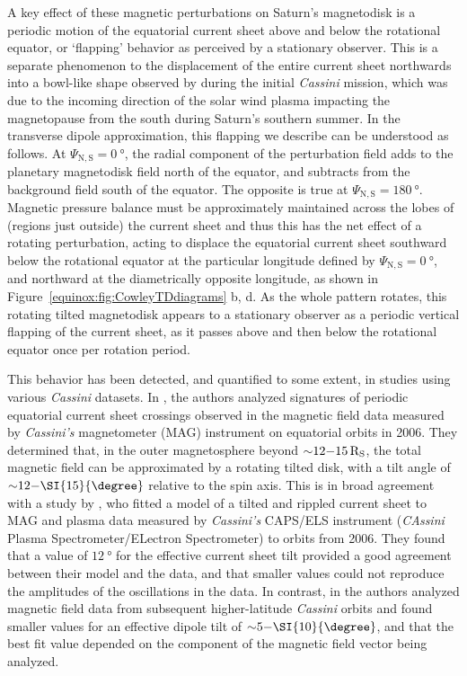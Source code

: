 A key effect of these magnetic perturbations on Saturn's magnetodisk is a periodic motion of the equatorial current sheet above and below the rotational equator, or `flapping' behavior as perceived by a stationary observer. This is a separate phenomenon to the displacement of the entire current sheet northwards into a bowl-like shape observed by \citet{arridge2008warp} during the initial \textit{Cassini} mission, which was due to the incoming direction of the solar wind plasma impacting the magnetopause from the south during Saturn's southern summer. In the transverse dipole approximation, this flapping we describe can be understood as follows. At $\Psi_\mathrm{N,S} = \SI{0}{\degree}$, the radial component of the perturbation field adds to the planetary magnetodisk field north of the equator, and subtracts from the background field south of the equator. The opposite is true at $\Psi_\mathrm{N,S} = \SI{180}{\degree}$. Magnetic pressure balance must be approximately maintained across the lobes of (regions just outside) the current sheet and thus this has the net effect of a rotating perturbation, acting to displace the equatorial current sheet southward below the rotational equator at the particular longitude defined by $\Psi_\mathrm{N,S} = \SI{0}{\degree}$, and northward at the diametrically opposite longitude, as shown in Figure~\ref{equinox:fig:CowleyTDdiagrams} b, d. As the whole pattern rotates, this rotating tilted magnetodisk appears to a stationary observer as a periodic vertical flapping of the current sheet, as it passes above and then below the rotational equator once per rotation period. 

This behavior has been detected, and quantified to some extent, in studies using various \textit{Cassini} datasets. In \citet{southwood2007}, the authors analyzed signatures of periodic equatorial current sheet crossings observed in the magnetic field data measured by \textit{Cassini's} magnetometer (MAG) instrument \citep{dougherty2004} on equatorial orbits in 2006. They determined that, in the outer magnetosphere beyond ${\sim}12{\--}\SI{15}{R_S}$, the total magnetic field can be approximated by a rotating tilted disk, with a tilt angle of ${\sim}12{\--}\SI{15}{\degree}$ relative to the spin axis. This is in broad agreement with a study by \citet{arridge2011}, who fitted a model of a tilted and rippled current sheet to MAG and plasma data measured by \textit{Cassini's} CAPS/ELS instrument (\textit{CAssini} Plasma Spectrometer/ELectron Spectrometer) \citep{young2004} to orbits from 2006. They found that a value of $\SI{12}{\degree}$ for the effective current sheet tilt provided a good agreement between their model and the data, and that smaller values could not reproduce the amplitudes of the oscillations in the data. In contrast, in \citet{provan2009} the authors analyzed magnetic field data from subsequent higher-latitude \textit{Cassini} orbits and found smaller values for an effective dipole tilt of ${\sim}5{\--}\SI{10}{\degree}$, and that the best fit value depended on the component of the magnetic field vector being analyzed. 

